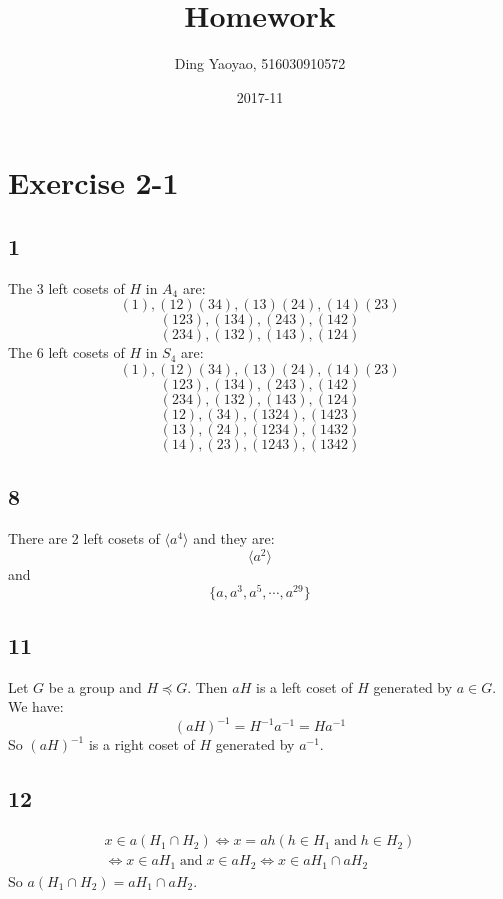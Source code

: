 \documentclass[draft]{article}
\title{Homework}
\date{2017-11}
\author{Ding Yaoyao, 516030910572}
\begin{document}
	\maketitle

	\section*{Exercise 2-1}
		\subsection*{1}
			The $3$ left cosets of $H$ in $A_4$ are:
			$$
				(1),(12)(34),(13)(24),(14)(23)
			$$
			$$
				(123),(134),(243),(142)
			$$
			$$
				(234),(132),(143),(124)
			$$
			The $6$ left cosets of $H$ in $S_4$ are:
			$$
				(1),(12)(34),(13)(24),(14)(23)
			$$
			$$
				(123),(134),(243),(142)
			$$
			$$
				(234),(132),(143),(124)
			$$
			$$
				(12),(34),(1324),(1423)
			$$
			$$
				(13),(24),(1234),(1432)
			$$
			$$
				(14),(23),(1243),(1342)
			$$
		\subsection*{8}
			There are 2 left cosets of $\langle a^4 \rangle$ and they are:
			$$
				\langle a^2 \rangle
			$$
			and
			$$
				\{a, a^3, a^5, \cdots, a^{29}\}
			$$
		\subsection*{11}
			Let $G$ be a group and $H \preceq G$. Then $aH$ is a left coset of $H$
			generated by $a \in G$. We have:
			$$
				(aH)^{-1} = H^{-1}a^{-1} = Ha^{-1}
			$$
			So $(aH)^{-1}$ is a right coset of $H$ generated by $a^{-1}$.
		\subsection*{12}
			\begin{equation*}
				\begin{split}
					x \in a(H_1\cap H_2) \Leftrightarrow x = ah(h \in H_1\;\text{and}\;h \in H_2) \\
					\Leftrightarrow x \in aH_1\;\text{and}\;x \in aH_2 \Leftrightarrow x \in aH_1 \cap aH_2
				\end{split}
			\end{equation*}
			So $a(H_1\cap H_2) = aH_1 \cap aH_2$.
\end{document}

